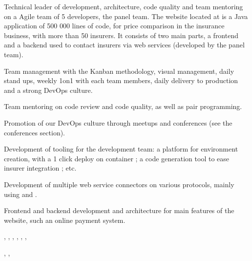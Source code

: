 \documentclass[a4paper]{article}
\begin{document}
\begin{cvexperience}%
  Technical leader of development, architecture, code quality and team
  mentoring on a Agile team of 5 developers, the panel team. The website
  located at  is a Java application of
  500 000 lines of code, for price comparison in the insurance business, with
  more than 50 insurers. It consists of two main parts, a 
  frontend and a backend used to contact insurers via web services (developed
  by the panel team).

  \begin{cvexperiencedescription}%
    \item Team management with the Kanban methodology, visual management, daily
      stand ups, weekly 1on1 with each team members, daily delivery to
      production and a strong DevOps culture.

    \item Team mentoring on code review and code quality, as well as pair
      programming.

    \item Promotion of our DevOps culture through meetups and conferences (see
      the conferences section).

    \item Development of tooling for the development team: a platform for
      environment creation, with a 1 click deploy on  container
      ; a code generation tool to ease insurer integration ; etc.

    \item Development of multiple web service connectors on various protocols,
      mainly using  and .

    \item Frontend and backend development and architecture for main features
      of the website, such an online payment system.
  \end{cvexperiencedescription}

  \begin{cvexperiencetech}[Technologies]%
    ,
    ,
    ,
    ,
    ,
    ,
  \end{cvexperiencetech}
  \begin{cvexperiencetech}[Culture]%
    ,
    ,
  \end{cvexperiencetech}
\end{cvexperience}
\end{document}
